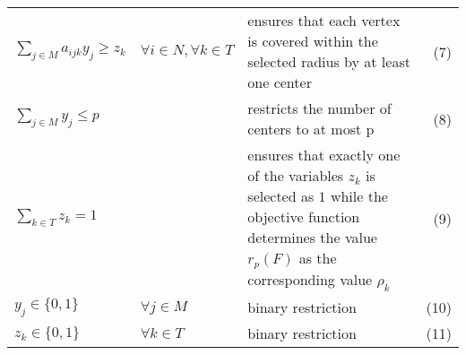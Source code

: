 \renewcommand{\arraystretch}{2}
\begin{tabularx}{\textwidth}{l l X r}
$\sum\limits_{j \in M} a_{ijk} y_j \geq z_k$ & $\forall i \in N, \forall k \in T$ & ensures that each vertex is covered within the selected radius by at least one center & (7)\\
$\sum\limits_{j \in M} y_j \leq p$ & & restricts the number of centers to at most p & (8)\\
$\sum\limits_{k \in T} z_k = 1$ & & ensures that exactly one of the variables $z_k$ is selected as $1$ while the objective function determines the value $r_p(F)$ as the corresponding value $\rho_k$ & (9)\\
$y_{j} \in \lbrace 0, 1\rbrace$ & $\forall j \in M$ & binary restriction & (10)\\
$z_k \in \lbrace 0, 1\rbrace$ & $\forall k \in T$ & binary restriction & (11)
\end{tabularx}
